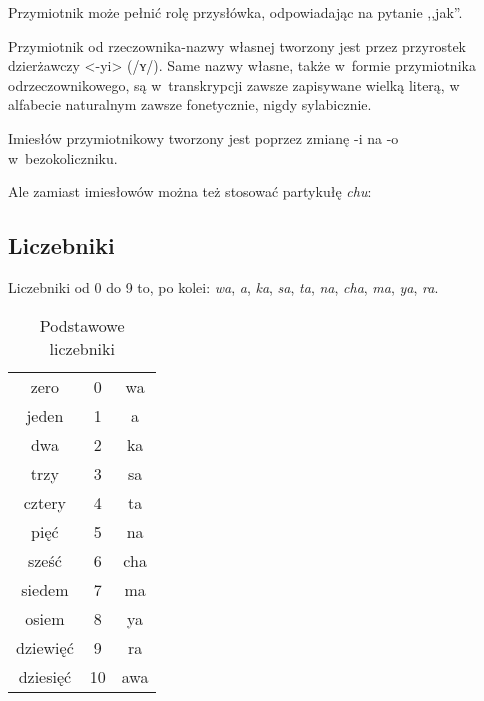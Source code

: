 \begin{spacing}{1.1}
Przymiotnik może pełnić rolę przysłówka, odpowiadając na pytanie ,,jak''.


Przymiotnik od rzeczownika-nazwy własnej tworzony jest przez przyrostek 
dzierżawczy <-yi> (/ʏ/). Same nazwy własne, także w~formie przymiotnika 
odrzeczownikowego, są w~transkrypcji zawsze zapisywane wielką literą, w~
alfabecie naturalnym zawsze fonetycznie, nigdy sylabicznie.

Imiesłów przymiotnikowy tworzony jest poprzez zmianę -i na -o w~bezokoliczniku.


Ale zamiast imiesłowów można też stosować partykułę \emph{chu}:






\subsection{Liczebniki}

Liczebniki od 0 do 9 to, po kolei: \emph{wa}, \emph{a}, \emph{ka}, \emph{sa}, 
\emph{ta}, \emph{na}, \emph{cha}, \emph{ma}, \emph{ya}, \emph{ra}.

\begin{table}[h]
	\centering
	\caption{Podstawowe liczebniki}
	\begin{tabular}{ccc} \toprule
		zero & 0 & wa \\
		jeden & 1 & a \\
		dwa & 2 & ka \\
		trzy & 3 & sa \\
		cztery & 4 & ta \\
		pięć & 5 & na \\
		sześć & 6 & cha \\
		siedem & 7 & ma \\
		osiem & 8 & ya \\
		dziewięć & 9 & ra \\
		dziesięć & 10 & awa \\\bottomrule
	\end{tabular}
	\label{tab:chars}
\end{table}


\end{spacing}
